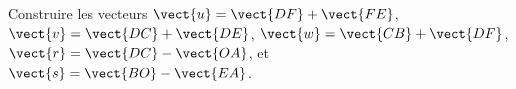 
\begin{exercice}\label{exosmath-0592}

    \begin{center}
   
    \end{center}

    Construire les vecteurs \( \vect{ u }=\vect{ DF }+\vect{ FE }\), \( \vect{ v }=\vect{ DC }+\vect{ DE }\), \( \vect{ w }=\vect{ CB }+\vect{ DF }\), \( \vect{ r }=\vect{ DC }-\vect{ OA }\), et \( \vect{ s }=\vect{ BO }-\vect{ EA }\).

\end{exercice}
